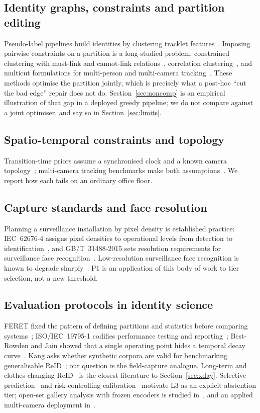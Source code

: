 \documentclass[journal]{IEEEtran}
\begin{document}
\subsection{Identity graphs, constraints and partition editing}
Pseudo-label pipelines build identities by clustering tracklet features~\cite{tang2026,ge2020}. Imposing pairwise constraints on a partition is a long-studied problem: constrained clustering with must-link and cannot-link relations~\cite{wagstaff2001}, correlation clustering~\cite{bansal2004}, and multicut formulations for multi-person and multi-camera tracking~\cite{tang2017,ristani2018}. These methods optimise the partition jointly, which is precisely what a post-hoc ``cut the bad edge'' repair does not do. Section~\ref{sec:noncomp} is an empirical illustration of that gap in a deployed greedy pipeline; we do not compare against a joint optimiser, and say so in Section~\ref{sec:limits}.

\subsection{Spatio-temporal constraints and topology}
Transition-time priors assume a synchronised clock and a known camera topology~\cite{ristani2016,ristani2018,makris2004}; multi-camera tracking benchmarks make both assumptions~\cite{aicity2026}. We report how each fails on an ordinary office floor.

\subsection{Capture standards and face resolution}
Planning a surveillance installation by pixel density is established practice: IEC~62676-4 assigns pixel densities to operational levels from detection to identification~\cite{iec62676}, and GB/T~31488-2015 sets resolution requirements for surveillance face recognition~\cite{gbt31488}. Low-resolution surveillance face recognition is known to degrade sharply~\cite{cheng2018}. P1 is an application of this body of work to tier selection, not a new threshold.

\subsection{Evaluation protocols in identity science}
FERET fixed the pattern of defining partitions and statistics before comparing systems~\cite{phillips2000}; ISO/IEC~19795-1 codifies performance testing and reporting~\cite{iso19795}; Best-Rowden and Jain showed that a single operating point hides a temporal decay curve~\cite{bestrowden2018}. Kang asks whether synthetic corpora are valid for benchmarking generalisable ReID~\cite{kang2025}; our question is the field-capture analogue. Long-term and clothes-changing ReID~\cite{yang2021,gu2022} is the closest literature to Section~\ref{sec:xday}. Selective prediction~\cite{geifman2017} and risk-controlling calibration~\cite{angelopoulos2025} motivate L3 as an explicit abstention tier; open-set gallery analysis with frozen encoders is studied in~\cite{wang2026sensors}, and an applied multi-camera deployment in~\cite{ding2025}.
\end{document}
